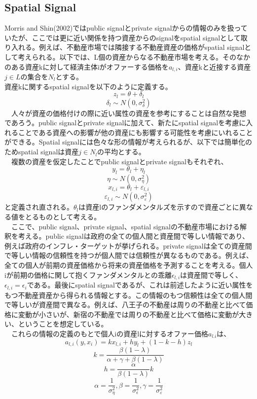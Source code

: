 \documentclass{jsarticle}
\begin{document}
\subsection{Spatial Signal}
Morris and Shin(2002)ではpublic signalとprivate signalからの情報のみを扱っていたが、ここでは更に近い関係を持つ資産からのsignalをspatial signalとして取り入れる。例えば、不動産市場では隣接する不動産資産の価格がspatial signalとして考えられる。以下では、L個の資産からなる不動産市場を考える。そのなかのある資産kに対して経済主体iがオファーする価格を$a_{l,i}$、資産kと近接する資産$j\in L$の集合を$N_{l}$とする。\\
資産kに関するspatial signalを以下のように定義する。
$$ z_{l} = \theta + \delta_{l} $$
$$ \delta_{l} \sim N(0, \sigma^{2}_{\delta}) $$
　人々が資産の価格付けの際に近い属性の資産を参考にすることは自然な発想であろう。public signalとprivate signalに加えて、新たにspatial signalを考慮に入れることである資産への影響が他の資産にも影響する可能性を考慮にいれることができる。Spatial signalには色々な形の情報が考えられるが、以下では簡単化のためspatial signalは資産$j\in N_{l}$の平均とする。\\
　複数の資産を仮定したことでpublic signalとprivate signalもそれぞれ、
$$ y_{l} = \theta_{l} + \eta_{l} $$
$$ \eta \sim N(0, \sigma^{2}_{\eta}) $$
$$ x_{l, i} = \theta_{l} + \varepsilon_{l, i} $$
$$ \varepsilon_{l, i} \sim N(0, \sigma^{2}_{\varepsilon}) $$
と定義され直される。$\theta_{l}$は資産lのファンダメンタルズを示すので資産ごとに異なる値をとるものとして考える。\\
　ここで、public signal、private signal、spatial signalの不動産市場における解釈を考える。public signalは政府の全ての個人間と資産間で等しい情報であり、例えば政府のインフレ・ターゲットが挙げられる。private signalは全ての資産間で等しい情報の信頼性を持つが個人間では信頼性が異なるものである。例えば、全ての個人が前期の資産価格から将来の資産価格を予測することを考える。個人iが前期の価格に関して抱くファンダメンタルとの乖離$\epsilon_{l, i}$は資産間で等しく、$\epsilon_{l, i} = \epsilon_{i}$である。最後にspatial signalであるが、これは前述したように近い属性をもつ不動産資産から得られる情報とする。この情報のもつ信頼性は全ての個人間で等しいが資産間で異なる。例えば、八王子の不動産は周りの不動産と比べて価格に変動が小さいが、新宿の不動産では周りの不動産と比べて価格に変動が大きい、ということを想定している。\\
　これらの情報の定義のもとで個人iの資産lに対するオファー価格$a_{l. i}$は、
$$ a_{l, i}(y, x_{i}) = kx_{l, i} + hy_{l} + (1 - k - h)z_{l} $$
$$ k = \frac{\beta(1-\lambda)}{\alpha + \gamma + \beta(1-\lambda)} $$
$$ h = \frac{\alpha}{\beta(1-\lambda)}k$$
$$ \alpha = \frac{1}{\sigma^{2}_{\eta}}, \beta = \frac{1}{\sigma^{2}_{\epsilon}}, \gamma = \frac{1}{\sigma^{2}_{\varepsilon}} $$
\end{document}
